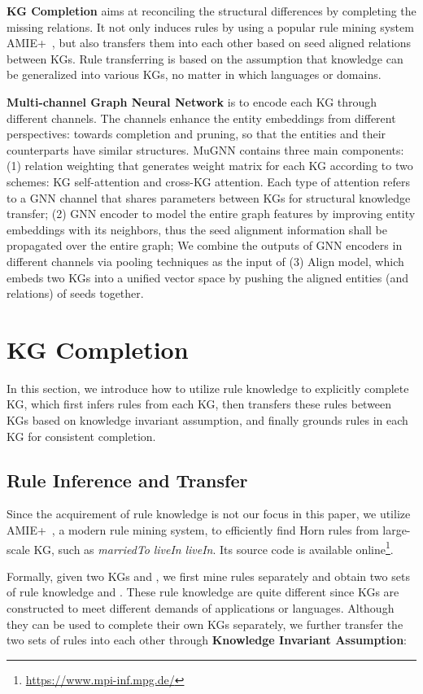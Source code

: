 \documentclass[11pt,a4paper]{article}
\newcommand{\vpara}[1]{\vspace{0.1in}\noindent\textbf{#1 }}
\begin{document}
\vpara{KG Completion} aims at reconciling the structural differences by completing the missing relations. It not only induces rules by using a popular rule mining system AMIE+~\cite{galarraga2015fast}, but also transfers them into each other based on seed aligned relations between KGs. Rule transferring is based on the assumption that knowledge can be generalized into various KGs, no matter in which languages or domains.

\vpara{Multi-channel Graph Neural Network} is to encode each KG through different channels. The channels enhance the entity embeddings from different perspectives: towards completion and pruning, so that the entities and their counterparts have similar structures. MuGNN contains three main components: (1) relation weighting that generates weight matrix for each KG according to two schemes: KG self-attention and cross-KG attention. Each type of attention refers to a GNN channel that shares parameters between KGs for structural knowledge transfer; (2) GNN encoder to model the entire graph features by improving entity embeddings with its neighbors, thus the seed alignment information shall be propagated over the entire graph; We combine the outputs of GNN encoders in different channels via pooling techniques as the input of (3) Align model, which embeds two KGs into a unified vector space by pushing the aligned entities (and relations) of seeds together.

\section{KG Completion}
In this section, we introduce how to utilize rule knowledge to explicitly complete KG, which first infers rules from each KG, then transfers these rules between KGs based on knowledge invariant assumption, and finally grounds rules in each KG for consistent completion.

\subsection{Rule Inference and Transfer}
Since the acquirement of rule knowledge is not our focus in this paper, we utilize AMIE+~\cite{galarraga2015fast}, a modern rule mining system, to efficiently find Horn rules from large-scale KG, such as \textit{marriedTo}  \textit{liveIn}  \textit{liveIn}. Its source code is available online\footnote{\url{https://www.mpi-inf.mpg.de/}}.

Formally, given two KGs  and , we first mine rules separately and obtain two sets of rule knowledge  and . These rule knowledge are quite different since KGs are constructed to meet different demands of applications or languages. Although they can be used to complete their own KGs separately, we further transfer the two sets of rules into each other through \textbf{Knowledge Invariant Assumption}:
\end{document}
